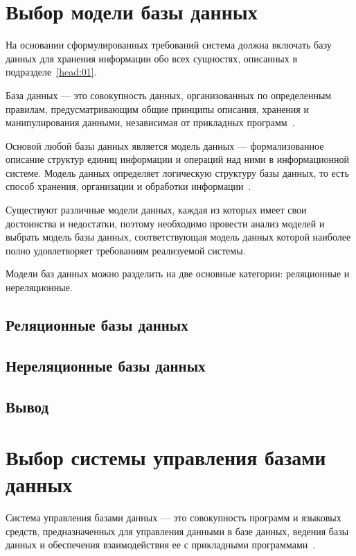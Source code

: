 \section{Выбор модели базы данных}

На основании сформулированных требований система должна включать базу данных для
хранения информации обо всех сущностях, описанных в подразделе~\ref{head:01}.

База данных --- это совокупность данных, организованных по определенным
правилам, предусматривающим общие принципы описания, хранения и манипулирования
данными, независимая от прикладных программ~\cite{gost01}.

Основой любой базы данных является модель данных --- формализованное описание
структур единиц информации и операций над ними в информационной системе.
Модель данных определяет логическую структуру базы данных, то есть
способ хранения, организации и обработки информации~\cite{book01}.

Существуют различные модели данных, каждая из которых имеет свои достоинства и
недостатки, поэтому необходимо провести анализ моделей и выбрать модель базы
данных, соответствующая модель данных которой наиболее полно удовлетворяет
требованиям реализуемой системы.

Модели баз данных можно разделить на две основные категории: реляционные и
нереляционные.

\subsection{Реляционные базы данных}

\subsection{Нереляционные базы данных}

\subsection*{Вывод}

\section{Выбор системы управления базами данных}

Система управления базами данных --- это совокупность программ и языковых
средств, предназначенных для управления данными в базе данных, ведения базы
данных и обеспечения взаимодействия ее с прикладными программами~\cite{gost01}.

